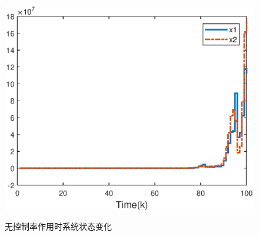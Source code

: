 \begin{figure}[!htb]
	\centering\includegraphics[scale=0.6]{./figures/lure_system/unstable_state2.eps}\\
	\caption{无控制率作用时系统状态变化}
	\label{lure_fig5}
\end{figure}

